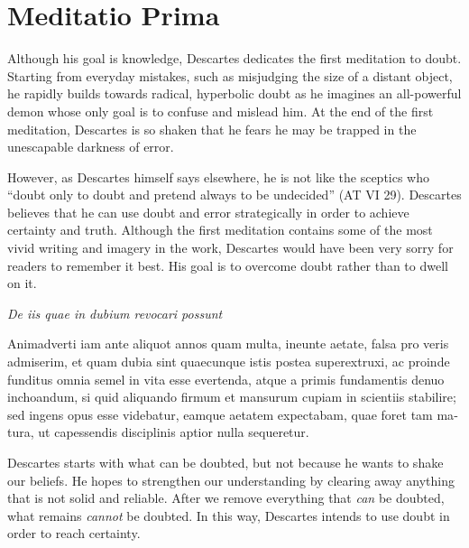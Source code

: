 \chapter{Meditatio Prima}


Although his goal is knowledge, Descartes dedicates the first meditation to doubt. Starting from everyday mistakes, such as misjudging the size of a distant object, he rapidly builds towards radical, hyperbolic doubt as he imagines an all-powerful demon whose only goal is to confuse and mislead him. At the end of the first meditation, Descartes is so shaken that he fears he may be trapped in the unescapable darkness of error.

However, as Descartes himself says elsewhere, he is not like the sceptics who ``doubt only to doubt and pretend always to be undecided'' (AT VI 29). Descartes believes that he can use doubt and error strategically in order to achieve certainty and truth. Although the first meditation contains some of the most vivid writing and imagery in the work, Descartes would have been very sorry for readers to remember it best. His goal is to overcome doubt rather than to dwell on it.

\clearpage
\begin{center}
    \beginnumbering
    \numberlinefalse
    \pstart
    \textit{De iis quae in dubium revocari possunt}
    \pend
    \endnumbering
\end{center}

\beginnumbering
\numberpstarttrue
\pstart
\begin{latin}
    Animadverti iam ante aliquot annos quam multa, ineunte aetate, falsa pro veris admiserim, et quam dubia sint quaecunque istis postea superextruxi, ac proinde funditus omnia semel in vita esse evertenda, atque a primis fundamentis denuo inchoandum, si quid aliquando firmum et mansurum cupiam in scientiis stabilire; sed ingens opus esse videbatur, eamque aetatem expectabam, quae foret tam matura, ut capessendis disciplinis aptior nulla sequeretur.
\end{latin}
\pend
\endnumbering

\prenotes

Descartes starts with what can be doubted, but not because he wants to shake our beliefs. He hopes to strengthen our understanding by clearing away anything that is not solid and reliable. After we remove everything that \textit{can} be doubted, what remains \textit{cannot} be doubted. In this way, Descartes intends to use doubt in order to reach certainty.

